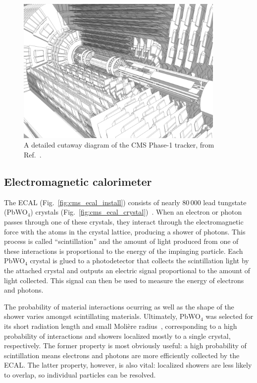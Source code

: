 \begin{figure}[htb]
    \centering
    \includegraphics[width=0.9\textwidth,valign=c]{fig/cms/tracker_detailed.png}
    \caption{
        A detailed cutaway diagram of the CMS Phase-1 tracker, from Ref.~\cite{Sakuma:2630160}. 
    }
    \label{fig:cms_tracker_layout}
\end{figure}

\subsection{Electromagnetic calorimeter}
The ECAL (Fig.~\ref{fig:cms_ecal_install}) consists of nearly 80\,000 lead tungstate (PbWO$_4$) crystals\footnotemark{} (Fig.~\ref{fig:cms_ecal_crystal})~\cite{CMSWebECAL}. 
When an electron or photon passes through one of these crystals, they interact through the electromagnetic force with the atoms in the crystal lattice, producing a shower of photons. 
This process is called ``scintillation'' and the amount of light produced from one of these interactions is proportional to the energy of the impinging particle. 
Each PbWO$_4$ crystal is glued to a photodetector that collects the scintillation light by the attached crystal and outputs an electric signal proportional to the amount of light collected. 
This signal can then be used to measure the energy of electrons and photons. 

The probability of material interactions ocurring as well as the shape of the shower varies amongst scintillating materials. 
Ultimately, PbWO$_4$ was selected for its short radiation length and small Moli\`ere radius~\cite{CERN-LHCC-97-033}, corresponding to a high probability of interactions and showers localized mostly to a single crystal, respectively. 
The former property is most obviously useful: a high probability of scintillation means electrons and photons are more efficiently collected by the ECAL. 
The latter property, however, is also vital: localized showers are less likely to overlap, so individual particles can be resolved. 

